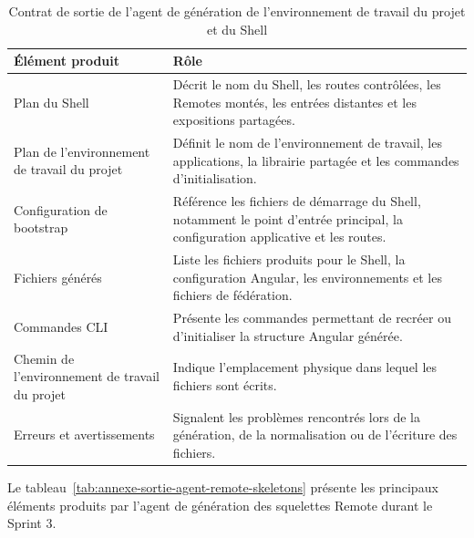 \begingroup
\renewcommand{\arraystretch}{1.12}
\setlength{\tabcolsep}{4pt}
\begin{longtable}{|p{4cm}|p{9.2cm}|}
\caption{Contrat de sortie de l'agent de génération de l'environnement de travail du projet et du Shell}\label{tab:annexe-sortie-agent-workspace-shell}\\
\hline
\textbf{Élément produit} & \textbf{Rôle} \\
\hline
Plan du Shell & Décrit le nom du Shell, les routes contrôlées, les Remotes montés, les entrées distantes et les expositions partagées. \\
\hline
Plan de l'environnement de travail du projet & Définit le nom de l'environnement de travail, les applications, la librairie partagée et les commandes d'initialisation. \\
\hline
Configuration de bootstrap & Référence les fichiers de démarrage du Shell, notamment le point d'entrée principal, la configuration applicative et les routes. \\
\hline
Fichiers générés & Liste les fichiers produits pour le Shell, la configuration Angular, les environnements et les fichiers de fédération. \\
\hline
Commandes CLI & Présente les commandes permettant de recréer ou d'initialiser la structure Angular générée. \\
\hline
Chemin de l'environnement de travail du projet & Indique l'emplacement physique dans lequel les fichiers sont écrits. \\
\hline
Erreurs et avertissements & Signalent les problèmes rencontrés lors de la génération, de la normalisation ou de l'écriture des fichiers. \\
\hline
\end{longtable}
\endgroup


Le tableau~\ref{tab:annexe-sortie-agent-remote-skeletons} présente les principaux éléments produits par l'agent de génération des squelettes Remote durant le Sprint 3.


